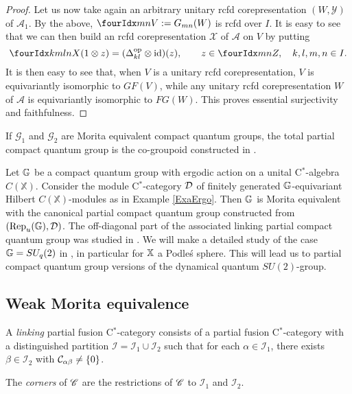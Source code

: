 \begin{proof}
Let us now take again an arbitrary unitary rcfd corepresentation $(W,\mathscr{Y})$ of $\mathscr{A}_1$. By the above, $\Gru{V}{m}{n} := G_{mn}(W)$ is rcfd over $I$. It is easy to see that we can then build an rcfd corepresentation $\mathscr{X}$ of $\mathscr{A}$ on $V$ by putting \[\Gr{X}{k}{l}{m}{n}(1\otimes z) = (\Delta_{kl}^{\op}\otimes \id)(z),\qquad z\in \Gru{Z}{m}{n}, \quad k,l,m,n\in I.\] It is then easy to see that, when $V$ is a unitary rcfd corepresentation, $V$ is equivariantly isomorphic to $GF(V)$, while any unitary rcfd corepresentation $W$ of $\mathscr{A}$ is equivariantly isomorphic to $FG(W)$. This proves essential surjectivity and faithfulness.
\end{proof}

\begin{Exa} If $\mathscr{G}_1$ and $\mathscr{G}_2$ are Morita equivalent compact quantum groups, the total partial compact quantum group is the co-groupoid constructed in \cite{Bic1}. 
\end{Exa}

\begin{Exa}  Let $\mathbb{G}$ be a compact quantum group with ergodic action on a unital C$^*$-algebra $C(\mathbb{X})$. Consider the module C$^*$-category $\mathcal{D}$ of finitely generated $\mathbb{G}$-equivariant Hilbert $C(\mathbb{X})$-modules as in Example \ref{ExaErgo}. Then $\mathbb{G}$ is Morita equivalent with the canonical partial compact quantum group constructed from $(\mathrm{Rep}_u(\mathbb{G}),\mathcal{D})$. The off-diagonal part of the associated linking partial compact quantum group was studied in \cite{DCY1}. We will make a detailed study of the case $\mathbb{G} = SU_q(2)$ in \cite{DCT2}, in particular for $\mathbb{X}$ a Podle\'{s} sphere. This will lead us to partial compact quantum group versions of the dynamical quantum $SU(2)$-group.
\end{Exa}


\subsection{Weak Morita equivalence}


\begin{Def} A \emph{linking} partial fusion C$^*$-category consists of a partial fusion C$^*$-category with a distinguished partition $\mathscr{I} =\mathscr{I}_1 \cup \mathscr{I}_2$ such that for each $\alpha\in \mathscr{I}_1$, there exists $\beta \in \mathscr{I}_{2}$ with $\mathcal{C}_{\alpha\beta}\neq \{0\}$.

The \emph{corners} of $\mathscr{C}$ are the restrictions of $\mathscr{C}$ to $\mathscr{I}_1$ and $\mathscr{I}_2$.
\end{Def}

